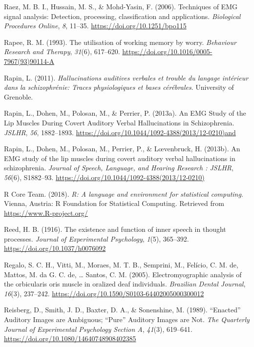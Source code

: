 \documentclass[a4paper,12pt,twoside,onecolumn,openright,final,oldfontcommands]{memoir}
\begin{document}
\leavevmode\hypertarget{ref-raez_techniques_2006}{}%
Raez, M. B. I., Hussain, M. S., \& Mohd-Yasin, F. (2006). Techniques of EMG signal analysis: Detection, processing, classification and applications. \emph{Biological Procedures Online}, \emph{8}, 11--35. \url{https://doi.org/10.1251/bpo115}

\leavevmode\hypertarget{ref-rapee_utilisation_1993}{}%
Rapee, R. M. (1993). The utilisation of working memory by worry. \emph{Behaviour Research and Therapy}, \emph{31}(6), 617--620. \url{https://doi.org/10.1016/0005-7967(93)90114-A}

\leavevmode\hypertarget{ref-Rapin2011}{}%
Rapin, L. (2011). \emph{Hallucinations auditives verbales et trouble du langage intérieur dans la schizophrénie: Traces physiologiques et bases cérébrales}. University of Grenoble.

\leavevmode\hypertarget{ref-rapin_emg_2013}{}%
Rapin, L., Dohen, M., Polosan, M., \& Perrier, P. (2013a). An EMG Study of the Lip Muscles During Covert Auditory Verbal Hallucinations in Schizophrenia. \emph{JSLHR}, \emph{56}, 1882--1893. \url{https://doi.org/10.1044/1092-4388(2013/12-0210)and}

\leavevmode\hypertarget{ref-Rapin2013}{}%
Rapin, L., Dohen, M., Polosan, M., Perrier, P., \& Lœvenbruck, H. (2013b). An EMG study of the lip muscles during covert auditory verbal hallucinations in schizophrenia. \emph{Journal of Speech, Language, and Hearing Research : JSLHR}, \emph{56}(6), S1882--93. \url{https://doi.org/10.1044/1092-4388(2013/12-0210)}

\leavevmode\hypertarget{ref-R-base}{}%
R Core Team. (2018). \emph{R: A language and environment for statistical computing}. Vienna, Austria: R Foundation for Statistical Computing. Retrieved from \url{https://www.R-project.org/}

\leavevmode\hypertarget{ref-reed_existence_1916}{}%
Reed, H. B. (1916). The existence and function of inner speech in thought processes. \emph{Journal of Experimental Psychology}, \emph{1}(5), 365--392. \url{https://doi.org/10.1037/h0076092}

\leavevmode\hypertarget{ref-regalo_electromyographic_2005}{}%
Regalo, S. C. H., Vitti, M., Moraes, M. T. B., Semprini, M., Felício, C. M. de, Mattos, M. da G. C. de, \ldots{} Santos, C. M. (2005). Electromyographic analysis of the orbicularis oris muscle in oralized deaf individuals. \emph{Brazilian Dental Journal}, \emph{16}(3), 237--242. \url{https://doi.org/10.1590/S0103-64402005000300012}

\leavevmode\hypertarget{ref-reisberg_enacted_1989}{}%
Reisberg, D., Smith, J. D., Baxter, D. A., \& Sonenshine, M. (1989). ``Enacted'' Auditory Images are Ambiguous; ``Pure'' Auditory Images are Not. \emph{The Quarterly Journal of Experimental Psychology Section A}, \emph{41}(3), 619--641. \url{https://doi.org/10.1080/14640748908402385}
\end{document}
